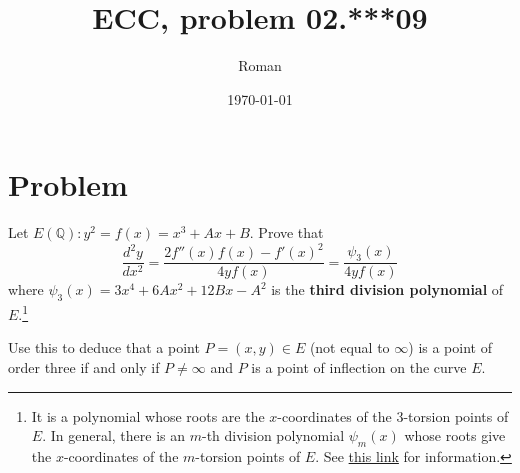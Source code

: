 \documentclass[12pt]{article}
\title{ECC, problem 02.***09}
\author{Roman}
\date{\today}
\begin{document}
\maketitle

\section*{Problem}

Let $E(\mathbb{Q}) : y^2 = f(x) = x^3 + Ax + B$. Prove that
\begin{equation*}
    \frac{d^2 y}{dx^2} = \frac{2 f''(x)f(x) - f'(x)^2}{4 y f(x)} = \frac{\psi_3(x)}{4 y f(x)}
\end{equation*}
where $\psi_3(x) = 3x^4 + 6Ax^2 + 12Bx - A^2$ is the \textbf{third division polynomial} of
$E$.\footnote{
    It is a polynomial whose roots are the $x$-coordinates of the 3-torsion points of $E$.
    In general, there is an $m$-th division polynomial $\psi_m(x)$ whose roots give the $x$-coordinates
    of the $m$-torsion points of $E$. See \href{https://en.wikipedia.org/wiki/Division_polynomials}{this link} for information.
}


Use this to deduce that a point $P = (x,y) \in E $ (not equal to $\infty$)
is a point of order three if and only if $P \neq \infty$ and $P$ is a point of inflection on the curve $E$.

\pagebreak
\end{document}
